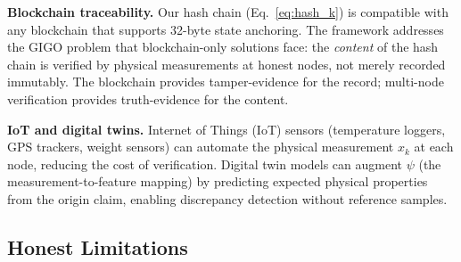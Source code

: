 \documentclass[11pt,a4paper]{article}
\theoremstyle{definition}
\theoremstyle{remark}
\begin{document}
\textbf{Blockchain traceability.} Our hash chain (Eq.~\ref{eq:hash_k}) is compatible with any blockchain that supports 32-byte state anchoring. The framework addresses the GIGO problem that blockchain-only solutions face: the \textit{content} of the hash chain is verified by physical measurements at honest nodes, not merely recorded immutably. The blockchain provides tamper-evidence for the record; multi-node verification provides truth-evidence for the content.

\textbf{IoT and digital twins.} Internet of Things (IoT) sensors (temperature loggers, GPS trackers, weight sensors) can automate the physical measurement $x_k$ at each node, reducing the cost of verification. Digital twin models can augment $\psi$ (the measurement-to-feature mapping) by predicting expected physical properties from the origin claim, enabling discrepancy detection without reference samples.

\subsection{Honest Limitations}
\end{document}
